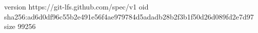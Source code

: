 version https://git-lfs.github.com/spec/v1
oid sha256:ad6d0df96c55b2e491e56f4ae979784d5adadb28b2f3b1f50d26d089fd2e7d97
size 99256
